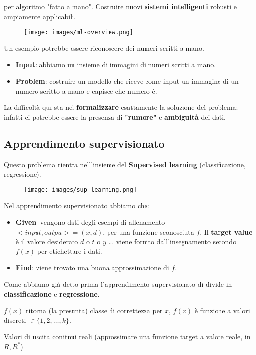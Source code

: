 per algoritmo "fatto a mano". Costruire nuovi \textbf{sistemi intelligenti} robusti e ampiamente applicabili.
\begin{figure}[h!]
    \centering
    \texttt{[image: images/ml-overview.png]}
\end{figure}
\begin{example}
    Un esempio potrebbe essere riconoscere dei numeri scritti a mano.
    \begin{itemize}
        \item \textbf{Input}: abbiamo un insieme di immagini di numeri scritti a mano.
        \item \textbf{Problem}: costruire un modello che riceve come input un immagine di un numero scritto a mano e capisce che numero è.
    \end{itemize}
    La difficoltà qui sta nel \textbf{formalizzare} esattamente la soluzione del problema: infatti ci potrebbe essere
    la presenza di \textbf{"rumore"} e \textbf{ambiguità} dei dati.
\end{example}
\subsection{Apprendimento supervisionato}
Questo problema rientra nell'insieme del \textbf{Supervised learning} (classificazione, regressione).
\begin{figure}[h!]
    \centering
    \texttt{[image: images/sup-learning.png]}
\end{figure}
Nel apprendimento supervisionato abbiamo che:
\begin{itemize}
    \item \textbf{Given}: vengono dati degli esempi di allenamento $<input, outpu> = (x,d)$, per una funzione sconosciuta $f$.
    Il \textbf{target value} è il valore desiderato $d$ o $t$ o $y$ ... viene fornito dall'insegnamento secondo $f(x)$ per etichettare i dati.
    \item \textbf{Find}: viene trovato una buona approssimazione di $f$.
\end{itemize}
Come abbiamo già detto prima l'apprendimento supervisionato di divide in \textbf{classificazione} e \textbf{regressione}.
\begin{definition}[Classificazione]
   $f(x)$ ritorna (la presunta) classe di correttezza per $x$, $f(x)$ è funzione a valori discreti $\in \{1, 2, \dots, k\}$.   
\end{definition}
\begin{definition}[Regressione]
    Valori di uscita conitnui reali (approssimare una funzione target a valore reale, in $R, R^*$)
\end{definition}


